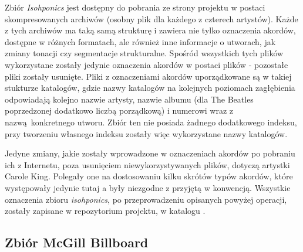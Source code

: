 Zbiór \emph{Isohponics} jest dostępny do pobrania ze strony projektu w postaci skompresowanych
archiwów  (osobny plik dla każdego z czterech artystów). Każde z tych archiwów ma taką
samą strukturę i zawiera nie tylko oznaczenia akordów, dostępne w różnych formatach, ale również
inne informacje o utworach, jak zmiany tonacji czy segmentacje strukturalne. Spośród wszystkich tych
plików wykorzystane zostały jedynie oznaczenia akordów w postaci plików  - pozostałe pliki
zostały usunięte. Pliki z oznaczeniami akordów uporządkowane są w takiej stukturze katalogów, gdzie
nazwy katalogów na kolejnych poziomach zagłębienia odpowiadają kolejno nazwie artysty, nazwie albumu
(dla The Beatles poprzedzonej dodatkowo liczbą porządkową) i numerowi wraz z nazwą konkretnego
utworu. Zbiór ten nie posiada żadnego dodatkowego indeksu, przy tworzeniu własnego indeksu zostały
więc wykorzystane nazwy katalogów.

Jedyne zmiany, jakie zostały wprowadzone w oznaczeniach akordów po pobraniu ich z Internetu, poza
usunięciem niewykorzystywanych plików, dotyczą artystki Carole King. Polegały one na dostosowaniu
kilku skrótów typów akordów, które występowały jedynie tutaj a były niezgodne z przyjętą w
\cite{harte_towards_nodate} konwencją. Wszystkie oznaczenia zbioru \emph{isohponics}, po
przeprowadzeniu opisanych powyżej operacji, zostały zapisane w repozytorium projektu, w katalogu
.


\subsection{Zbiór McGill Billboard}

